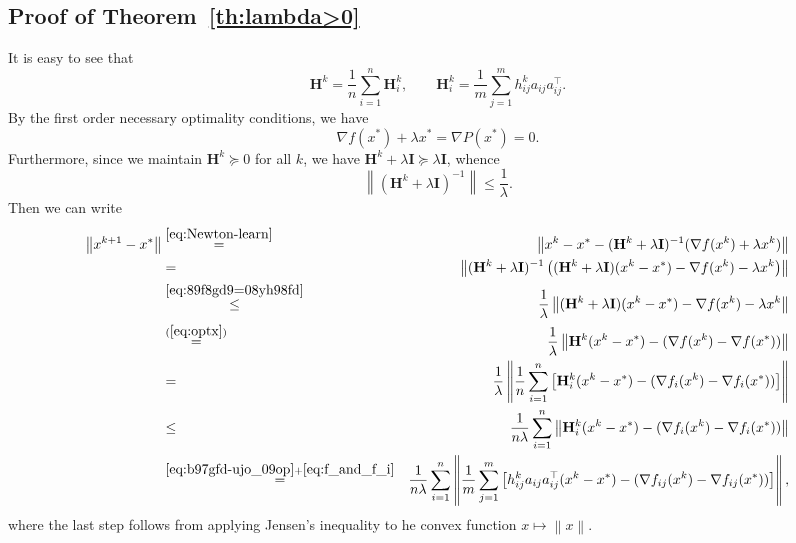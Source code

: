 \documentclass[10pt]{article}
\newcommand{\norm}[1]{\left\|#1\right\|}
\newcommand{\mH}{\mathbf{H}}
\newcommand{\mI}{\mathbf{I}}
\begin{document}
\subsection{Proof of Theorem~\ref{th:lambda>0}}


It is easy to see that \begin{equation}\label{eq:b97gfd-ujo_09op}\mH^k = \frac{1}{n} \sum_{i=1}^n \mH^k_i, \qquad \mH^k_i = \frac{1}{m} \sum_{j=1}^{m} h^k_{ij} a_{ij}a_{ij}^\top .\end{equation}
By the first order necessary optimality conditions, we have
\begin{equation}\label{eq:optx}
\nabla f(x^*) + \lambda x^*  = \nabla P(x^*)= 0. 
\end{equation}
Furthermore, since we maintain $\mH^k \succeq 0$ for all $k$, we have $\mH^k + \lambda \mI \succeq \lambda \mI$, whence  \begin{equation}\label{eq:89f8gd9=08yh98fd}\norm{\left(\mH^k + \lambda \mI \right)^{-1}} \leq \frac{1}{\lambda}.\end{equation}
Then we can write
\begin{eqnarray}
	\norm{ x^{k+1} - x^* } &\overset{\eqref{eq:Newton-learn}}{=}& \norm{ x^k - x^* - (\mH^k + \lambda \mI)^{-1} (\nabla f(x^k) + \lambda x^k) }\notag  \\
	&=& \norm{ (\mH^k + \lambda \mI)^{-1} \left(  (\mH^k + \lambda \mI)(x^k - x^*) - \nabla f(x^k) - \lambda x^k  \right) } \notag \\ 
	&\overset{\eqref{eq:89f8gd9=08yh98fd}}{\leq}& \frac{1}{\lambda} \norm{  (\mH^k + \lambda \mI)(x^k - x^*) - \nabla f(x^k) - \lambda x^k  } \notag \\ 
	&\overset{(\ref{eq:optx})}{=}& \frac{1}{\lambda} \norm{ \mH^k (x^k - x^*) - (\nabla f(x^k) - \nabla f(x^*)) } \notag \\ 
	&=& \frac{1}{\lambda} \norm{ \frac{1}{n} \sum_{i=1}^n \left[\mH_i^k (x^k - x^*) - (\nabla f_i(x^k) - \nabla f_i(x^*)) \right]}\notag  \\ 
	&\leq& \frac{1}{n \lambda} \sum_{i=1}^n \norm{ \mH_i^k (x^k - x^*) - (\nabla f_i(x^k) - \nabla f_i(x^*)) } \notag  \\
	&\overset{\eqref{eq:b97gfd-ujo_09op}+\eqref{eq:f_and_f_i} }{=}& \frac{1}{n \lambda} \sum_{i=1}^n \norm{ \frac{1}{m} \sum_{j=1}^m  \left[ h_{ij}^k a_{ij} a_{ij}^\top (x^k - x^*) - (\nabla f_{ij}(x^k) - \nabla f_{ij}(x^*)) \right] },\label{eq:pop_us_lop_989f}
	\end{eqnarray}
	where the last step follows from applying Jensen's inequality to he convex function $x\mapsto \norm{x}$. 
\end{document}
